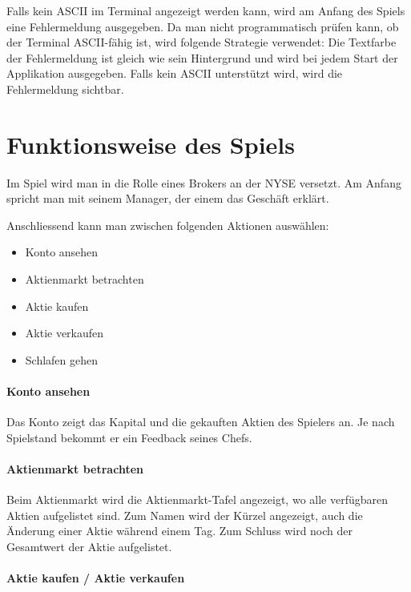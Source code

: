\documentclass[paper=a4, fontsize=11pt]{article}
\numberwithin{equation}{section}		%
\numberwithin{figure}{section}			%
\numberwithin{table}{section}				%
\begin{document}
	Falls kein ASCII im Terminal angezeigt werden kann, wird am Anfang des Spiels eine Fehlermeldung ausgegeben. Da man nicht programmatisch prüfen kann, ob der Terminal ASCII-fähig ist, wird folgende Strategie verwendet: Die Textfarbe der Fehlermeldung ist gleich wie sein Hintergrund und wird bei jedem Start der Applikation ausgegeben. Falls kein ASCII unterstützt wird, wird die Fehlermeldung sichtbar.
	
	\section{Funktionsweise des Spiels}
	
	Im Spiel wird man in die Rolle eines Brokers an der NYSE versetzt. Am Anfang spricht man mit seinem Manager, der einem das Geschäft erklärt.
	
	Anschliessend kann man zwischen folgenden Aktionen auswählen:
	
	\begin{itemize}
		\item{Konto ansehen}
		\item{Aktienmarkt betrachten}
		\item{Aktie kaufen}
		\item{Aktie verkaufen}
		\item{Schlafen gehen}
	\end{itemize}
	
	\paragraph{Konto ansehen}
	
	Das Konto zeigt das Kapital und die gekauften Aktien des Spielers an. Je nach Spielstand bekommt er ein Feedback seines Chefs.
	
	\paragraph{Aktienmarkt betrachten}
	
	Beim Aktienmarkt wird die Aktienmarkt-Tafel angezeigt, wo alle verfügbaren Aktien aufgelistet sind. Zum Namen wird der Kürzel angezeigt, auch die Änderung einer Aktie während einem Tag. Zum Schluss wird noch der Gesamtwert der Aktie aufgelistet.
	
	\paragraph{Aktie kaufen / Aktie verkaufen}	
	
\end{document}
